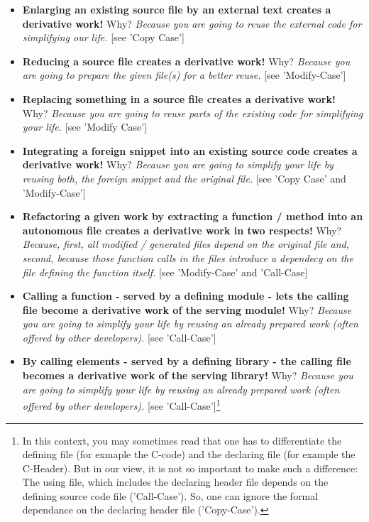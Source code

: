 {\begin{itemize}
  \item \textbf{Enlarging an existing source file by an external text creates a
  derivative work!} Why? \emph{Because you are going to reuse the
  external code for simplifying our life.} [see 'Copy Case']
  \item \textbf{Reducing a source file creates a derivative work!} Why?
  \emph{Because you are going to prepare the given file(s) for a better reuse.}
  [see 'Modify-Case']
  \item \textbf{Replacing something in a source file creates a derivative work!}
  Why? \emph{Because you are going to reuse parts of the existing code for
  simplifying your life.} [see 'Modify Case']
  \item \textbf{Integrating a foreign snippet into an existing source code
  creates a derivative work!} Why? \emph{Because you are going to simplify
  your life by reusing both, the foreign snippet and the original file.} [see
  'Copy Case' and 'Modify-Case']
  \item \textbf{Refactoring a given work by extracting a function / method into
  an autonomous file creates a derivative work in two respects!} Why?
  \emph{Because, first, all modified / generated files depend
  on the original file and, second, because those function calls in the files
  introduce a dependecy on the file defining the function itself.}
  [see 'Modify-Case' and 'Call-Case]
  \item \textbf{Calling a function - served by a defining module - lets the
  calling file become a derivative work of the serving module!} Why?
  \emph{Because you are going to simplify your life by reusing an already
  prepared work (often offered by other developers).} [see 'Call-Case']
  \item \textbf{By calling elements - served by a defining library - the
  calling file becomes a derivative work of the serving library!} Why? 
  \emph{Because you are going to simplify your life by reusing an already
  prepared work (often offered by other developers).} [see
  'Call-Case']\footnote{In this context, you may sometimes read that one has to
  differentiate the defining file (for exmaple the C-code) and the declaring
  file (for example the C-Header). But in our view, it is not so important to
  make such a difference: The using file, which includes the declaring header
  file depends on the defining source code file ('Call-Case'). So, one can
  ignore the formal dependance on the declaring header file ('Copy-Case').}
\end{itemize}

}
